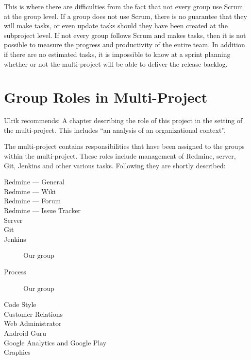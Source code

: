 This is where there are difficulties from the fact that not every group use Scrum at the group level. If a group does not use Scrum, there is no guarantee that they will make tasks, or even update tasks should they have been created at the subproject level. If not every group follows Scrum and makes tasks, then it is not possible to measure the progress and productivity of the entire team. In addition if there are no estimated tasks, it is impossible to know at a sprint planning whether or not the multi-project will be able to deliver the release backlog.

\section{Group Roles in Multi-Project}\label{sec:multi_project_group_roles}
Ulrik recommends: A chapter describing the role of this project in the setting of the multi-project. This includes ``an analysis of an organizational context''.

The multi-project contains responsibilities that have been assigned to the groups within the multi-project. These roles include management of Redmine, server, Git, Jenkins and other various tasks. Following they are shortly described:

\begin{description}
  \item[Redmine --- General] \dummy \dummy
  \item[Redmine --- Wiki] \dummy \dummy
  \item[Redmine --- Forum] \dummy
  \item[Redmine --- Issue Tracker] \dummy \dummy
  \item[Server] \dummy \dummy
  \item[Git] \dummy \dummy
  \item[Jenkins] Our group
  \item[Process] Our group
  \item[Code Style] \dummy \dummy
  \item[Customer Relations] 
  \item[Web Administrator] \dummy \dummy
  \item[Android Guru] \dummy \dummy
  \item[Google Analytics and Google Play] \dummy \dummy
  \item[Graphics] \dummy \dummy
\end{description}